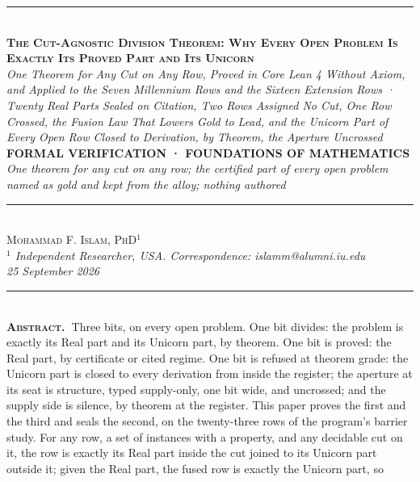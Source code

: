 \documentclass[10pt]{article}
\begin{document}
{%
\begin{center}
{\color{accent}\rule{0.6\textwidth}{0.8pt}}\\[10pt]
{\bfseries\scshape\fontsize{20}{23}\selectfont The Cut-Agnostic Division
Theorem: Why Every Open Problem Is Exactly Its Proved Part and Its
Unicorn}\\[7pt]
{\itshape\large One Theorem for Any Cut on Any Row, Proved in Core Lean
4 Without Axiom, and Applied to the Seven Millennium Rows and the
Sixteen Extension Rows · Twenty Real Parts Sealed on Citation, Two Rows
Assigned No Cut, One Row Crossed, the Fusion Law That Lowers Gold to
Lead, and the Unicorn Part of Every Open Row Closed to Derivation, by
Theorem, the Aperture Uncrossed}\\[8pt]
{\footnotesize\color{accent}\scshape\bfseries FORMAL VERIFICATION ·
FOUNDATIONS OF MATHEMATICS}\\[3pt]
{\itshape\color{deep}\small One theorem for any cut on any row; the
certified part of every open problem named as gold and kept from the
alloy; nothing authored}\\[9pt]
{\color{accent}\rule{0.6\textwidth}{0.8pt}}\\[10pt]
{\scshape Mohammad F. Islam, PhD\(^{1}\)}\\[2pt]
{\itshape\color{faint}\small \(^{1}\) Independent Researcher, USA.
Correspondence: islamm@alumni.iu.edu}\\[2pt]
{\itshape\color{faint}\small 25 September 2026}\\[14pt]
\end{center}
\begin{minipage}{\textwidth}
{\color{accent}\rule{\textwidth}{0.6pt}}\\[4pt]
{\small\hspace{1em}\textbf{\scshape\color{deep}Abstract.\ }Three bits,
on every open problem. One bit divides: the problem is exactly its Real
part and its Unicorn part, by theorem. One bit is proved: the Real part,
by certificate or cited regime. One bit is refused at theorem grade: the
Unicorn part is closed to every derivation from inside the register; the
aperture at its seat is structure, typed supply-only, one bit wide, and
uncrossed; and the supply side is silence, by theorem at the register.
This paper proves the first and the third and seals the second, on the
twenty-three rows of the program's barrier study. For any row, a set of
instances with a property, and any decidable cut on it, the row is
exactly its Real part inside the cut joined to its Unicorn part outside
it; given the Real part, the fused row is exactly the Unicorn part, so
}
\end{minipage}}
\end{document}
